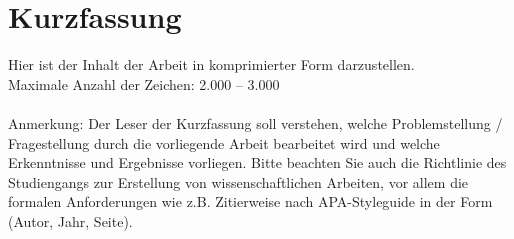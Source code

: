 \newpage
{}
\chapter*{Kurzfassung}
Hier ist der Inhalt der Arbeit in komprimierter Form darzustellen. 
\\Maximale Anzahl der Zeichen: 2.000 – 3.000
\\
\\
Anmerkung: 
Der Leser der Kurzfassung soll verstehen, welche Problemstellung / Fragestellung durch die vorliegende Arbeit bearbeitet wird und welche Erkenntnisse und Ergebnisse vorliegen.
Bitte beachten Sie auch die Richtlinie des Studiengangs zur Erstellung von wissenschaftlichen Arbeiten, vor allem die formalen Anforderungen wie z.B. Zitierweise nach APA-Styleguide in der Form (Autor, Jahr, Seite). 
\\
\\
\blindtext[1]